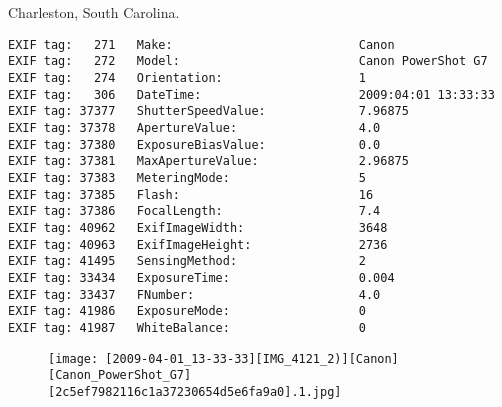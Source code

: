 \section{\protect{}}
\noindent Charleston, South Carolina.
\noindent
\begin{lstlisting}
EXIF tag:   271   Make:                          Canon
EXIF tag:   272   Model:                         Canon PowerShot G7
EXIF tag:   274   Orientation:                   1
EXIF tag:   306   DateTime:                      2009:04:01 13:33:33
EXIF tag: 37377   ShutterSpeedValue:             7.96875
EXIF tag: 37378   ApertureValue:                 4.0
EXIF tag: 37380   ExposureBiasValue:             0.0
EXIF tag: 37381   MaxApertureValue:              2.96875
EXIF tag: 37383   MeteringMode:                  5
EXIF tag: 37385   Flash:                         16
EXIF tag: 37386   FocalLength:                   7.4
EXIF tag: 40962   ExifImageWidth:                3648
EXIF tag: 40963   ExifImageHeight:               2736
EXIF tag: 41495   SensingMethod:                 2
EXIF tag: 33434   ExposureTime:                  0.004
EXIF tag: 33437   FNumber:                       4.0
EXIF tag: 41986   ExposureMode:                  0
EXIF tag: 41987   WhiteBalance:                  0

\end{lstlisting}
\clearpage
\begin{figure}
\raggedleft
\texttt{[image: [2009-04-01\_13-33-33][IMG\_4121\_2)][Canon][Canon\_PowerShot\_G7][2c5ef7982116c1a37230654d5e6fa9a0].1.jpg]}
\end{figure}


\clearpage
